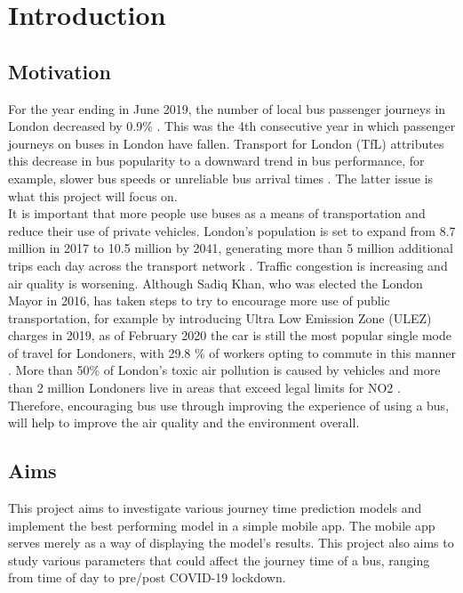 \section{Introduction}

\subsection{Motivation}

For the year ending in June 2019, the number of local bus passenger journeys in London decreased by 0.9\% \cite{quarterly-bus-stats}. This was the 4th consecutive year in which passenger journeys on buses in London have fallen. Transport for London (TfL) attributes this decrease in bus popularity to a downward trend in bus performance, for example, slower bus speeds or unreliable bus arrival times \cite{annual-bus-stats}. The latter issue is what this project will focus on. \\ 

It is important that more people use buses as a means of transportation and reduce their use of private vehicles. London's population is set to expand from 8.7 million in 2017 to 10.5 million by 2041, generating more than 5 million additional trips each day across the transport network \cite{mayor-reduce-car-use}. Traffic congestion is increasing and air quality is worsening. Although Sadiq Khan, who was elected the London Mayor in 2016, has taken steps to try to encourage more use of public transportation, for example by introducing Ultra Low Emission Zone (ULEZ) charges in 2019, as of February 2020 the car is still the most popular single mode of travel for Londoners, with 29.8 \% of workers opting to commute in this manner \cite{motoring-faqs}. More than 50\% of London's toxic air pollution is caused by vehicles and more than 2 million Londoners live in areas that exceed legal limits for NO2 \cite{mayor-car-free-day}. Therefore, encouraging bus use through improving the experience of using a bus, will help to improve the air quality and the environment overall.

\subsection{Aims}

This project aims to investigate various journey time prediction models and implement the best performing model in a simple mobile app. The mobile app serves merely as a way of displaying the model's results. This project also aims to study various parameters that could affect the journey time of a bus, ranging from time of day to pre/post COVID-19 lockdown. \\

